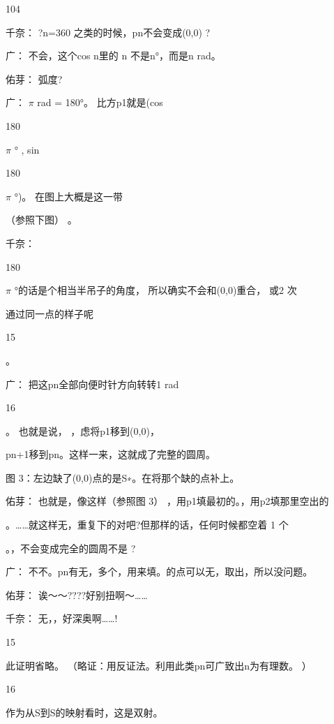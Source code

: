 104\par
千奈： ?n=360 之类的时候，pn不会变成(0,0) ?\par
广： 不会，这个cos n里的 n 不是n°，而是n rad。\par
佑芽： 弧度?\par
广： $\pi$ rad = 180°。 比方p1就是(cos\par
180\par
$\pi$ ° , sin\par
180\par
$\pi$ °)。 在图上大概是这一带\par
（参照下图） 。\par
千奈：\par
180\par
$\pi$ °的话是个相当半吊子的角度， 所以确实不会和(0,0)重合， 或2 次\par
通过同一点的样子呢\par
15\par
。\par
广： 把这pn全部向便时针方向转转1 rad\par
16\par
。 也就是说， ，虑将p1移到(0,0)，\par
pn+1移到pn。这样一来，这就成了完整的圆周。\par
图 3：左边缺了(0,0)点的是S∗。在将那个缺的点补上。\par
佑芽： 也就是，像这样（参照图 3） ，用p1填最初的。，用p2填那里空出的\par
。……就这样无，重复下的对吧?但那样的话，任何时候都空着 1 个\par
。，不会变成完全的圆周不是 ?\par
广： 不不。pn有无，多个，用来填。的点可以无，取出，所以没问题。\par
佑芽： 诶～～????好别扭啊～……\par
千奈： 无，，好深奥啊……!\par
15\par
此证明省略。 （略证：用反证法。利用此类pn可广致出n为有理数。 ）\par
16\par
作为从S到S的映射看时，这是双射。\par

